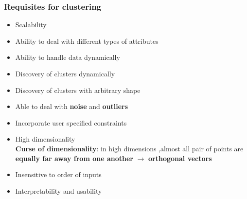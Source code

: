 \subsubsection{Requisites for clustering}
\begin{itemize}
\item Scalability 
\item Ability to deal with different types of attributes
\item Ability to handle data dynamically
\item Discovery of clusters dynamically
\item Discovery of clusters with arbitrary shape
\item Able to deal with \textbf{noise} and \textbf{outliers}
\item Incorporate user specified constraints
\item High dimensionality\\
\textbf{Curse of dimensionality}: in high dimensions ,almost all pair of points are \textbf{equally far away from one another} $\rightarrow$ \textbf{orthogonal vectors}
\item Insensitive to order of inputs
\item Interpretability and usability
\end{itemize}

